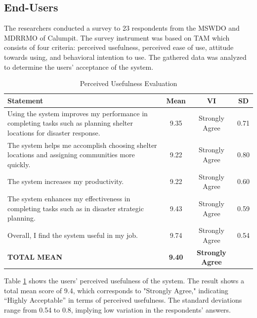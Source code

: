 \documentclass[12pt,a4paper,]{article}
\begin{document}
	\subsection{End-Users}
	The researchers conducted a survey to 23 respondents from the MSWDO and MDRRMO of Calumpit. The survey instrument was based on TAM which consists of four criteria: perceived usefulness, perceived ease of use, attitude towards using, and behavioral intention to use. The gathered data was analyzed to determine the users’ acceptance of the system. 
	
	\begin{table}[h!]
		\centering
		\caption{Perceived Usefulness Evaluation}
		\label{percuse}
		\renewcommand{\arraystretch}{1.2}
		\begin{tabularx}{\linewidth}{|X|c|c|c|}
			\hline
			\textbf{Statement} & \textbf{Mean} & \textbf{VI} & \textbf{SD} \\ \hline
			Using the system improves my performance in completing tasks such as planning shelter locations for disaster response.
			& 9.35 & Strongly Agree & 0.71 \\ \hline
			The system helps me accomplish choosing shelter locations and assigning communities more quickly.
			& 9.22 & Strongly Agree & 0.80 \\ \hline
			The system increases my productivity.
			& 9.22 & Strongly Agree & 0.60 \\ \hline
			The system enhances my effectiveness in completing tasks such as in disaster strategic planning.
			& 9.43 & Strongly Agree & 0.59 \\ \hline
			Overall, I find the system useful in my job.
			& 9.74 & Strongly Agree & 0.54 \\ \hline
			\textbf{TOTAL MEAN} & \textbf{9.40} & \textbf{Strongly Agree} & \\ \hline
		\end{tabularx}
	\end{table}
	
	Table \ref{percuse} shows the users’ perceived usefulness of the system. The result shows a total mean score of 9.4, which corresponds to "Strongly Agree," indicating “Highly Acceptable” in terms of perceived usefulness. The standard deviations range from 0.54 to 0.8, implying low variation in the respondents’ answers.
	
\end{document}
